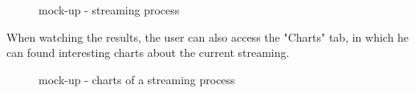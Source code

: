 \documentclass[a4paper,11pt]{report}
\begin{document}
\begin{figure}[H]
\begin{center}
\caption{mock-up - streaming process}
\end{center}
\end{figure}
\vspace*{\fill}
\newpage
\vspace*{\fill}
When watching the results, the user can also access the "Charts" tab, in which he can found interesting charts about the current streaming.
\bigskip
\begin{figure}[H]
\begin{center}
\caption{mock-up - charts of a streaming process}
\end{center}
\end{figure}
\end{document}
